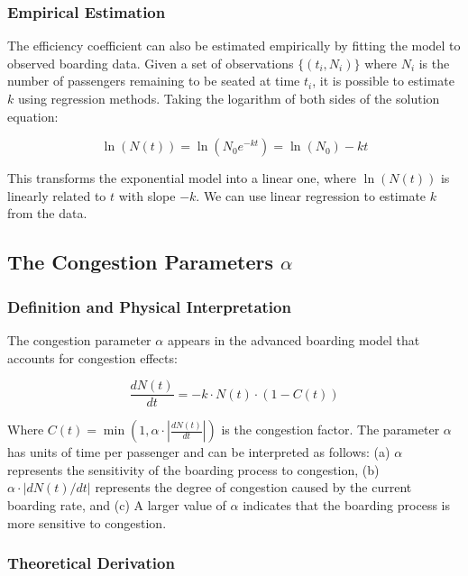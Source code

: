 \documentclass[12pt]{article}
\begin{document}
\subsubsection{Empirical Estimation}

The efficiency coefficient can also be estimated empirically by fitting the model to observed boarding data. Given a set of observations $\{(t_i, N_i)\}$ where $N_i$ is the number of passengers remaining to be seated at time $t_i$, it is possible to estimate $k$ using regression methods. Taking the logarithm of both sides of the solution equation:

\begin{equation}
\ln(N(t)) = \ln(N_0 e^{-kt}) = \ln(N_0) - kt
\end{equation}

This transforms the exponential model into a linear one, where $\ln(N(t))$ is linearly related to $t$ with slope $-k$. We can use linear regression to estimate $k$ from the data.

\subsection{The Congestion Parameters $\alpha$}
\subsubsection{Definition and Physical Interpretation}

The congestion parameter $\alpha$ appears in the advanced boarding model that accounts for congestion effects:

\begin{equation}
\frac{dN(t)}{dt} = -k \cdot N(t) \cdot (1 - C(t))
\end{equation}

Where $C(t) = \min(1, \alpha \cdot |\frac{dN(t)}{dt}|)$ is the congestion factor. The parameter $\alpha$ has units of time per passenger and can be interpreted as follows: (a) $\alpha$ represents the sensitivity of the boarding process to congestion, (b) $\alpha \cdot |dN(t)/dt|$ represents the degree of congestion caused by the current boarding rate, and (c) A larger value of $\alpha$ indicates that the boarding process is more sensitive to congestion.

\subsubsection{Theoretical Derivation}
\end{document}
